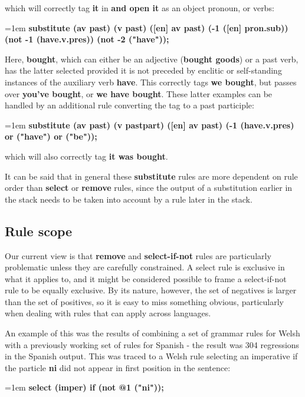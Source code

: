 \documentclass[11pt]{article}
\begin{document}
\noindent which will correctly tag \textbf{it} in \textbf{and open it} as an object pronoun, or verbs:

\noindent
\hangindent=1em
\textbf{substitute (av past) (v past) ([en] av past) (-1 ([en] pron.sub)) (not -1 (have.v.pres)) (not -2 ("have"));}

\noindent Here, \textbf{bought}, which can either be an adjective (\textbf{bought goods}) or a past verb, has the latter selected provided it is not preceded by enclitic or self-standing instances of the auxiliary verb \textbf{have}. This correctly tags \textbf{we bought}, but passes over \textbf{you've bought}, or \textbf{we have bought}.  These latter examples can be handled by an additional rule converting the tag to a past participle:

\noindent
\hangindent=1em
\textbf{substitute (av past) (v pastpart) ([en] av past) (-1 (have.v.pres) or ("have") or ("be"));}

\noindent which will also correctly tag \textbf{it was bought}.

It can be said that in general these \textbf{substitute} rules are more dependent on rule order than \textbf{select} or \textbf{remove} rules, since the output of a substitution earlier in the stack needs to be taken into account by a rule later in the stack.


\subsection{Rule scope}
\label{sec:scope}


Our current view is that \textbf{remove} and \textbf{select-if-not} rules are particularly problematic unless they are carefully constrained.  A select rule is exclusive in what it applies to, and it might be considered possible to frame a select-if-not rule to be equally exclusive.  By its nature, however, the set of negatives is larger than the set of positives, so it is easy to miss something obvious, particularly when dealing with rules that can apply across languages.

An example of this was the results of combining a set of grammar rules for Welsh with a previously working set of rules for Spanish - the result was 304 regressions in the Spanish output.  This was traced to a Welsh rule selecting an imperative if the particle \textbf{ni} did not appear in first position in the sentence:

\noindent
\hangindent=1em
\textbf{select (imper) if (not @1 ("ni"));}
\end{document}

